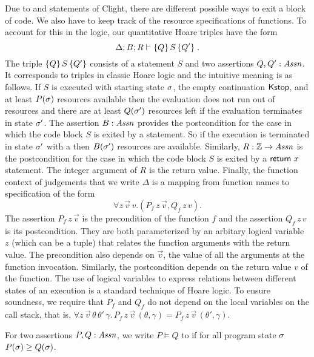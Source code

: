 \documentclass[nocopyrightspace,preprint]{sigplanconf}
\begin{document}
Due to  and  statements of Clight, there are
different possible ways to exit a block of code.  We also have to keep
track of the resource specifications of functions.  To account for
this in the logic, our quantitative Hoare triples have the form
$$
\Delta; B; R \vdash
\{ Q \}\,  S \, \{ Q' \} \; .
$$
The triple $\{ Q \}\,  S \, \{ Q' \}$ consists of a statement $S$ and
two assertions $Q,Q' : \mathit{Assn}$.  It corresponds to triples in classic
Hoare logic and the intuitive meaning is as follows.  If $S$ is
executed with starting state $\sigma$, the empty continuation
$\mathsf{Kstop}$, and at least $P(\sigma)$ resources available then the
evaluation does not run out of resources and there are at least
$Q(\sigma')$ resources left if the evaluation terminates in state
$\sigma'$.  The assertion $B : \mathit{Assn}$ provides the
postcondition for the case in which the code block $S$ is exited by a
 statement.  So if the execution is terminated in state
$\sigma'$ with a  then $B(\sigma')$ resources are
available.  Similarly, $R : \mathbb{Z} \to \mathit{Assn}$ is the postcondition for the
case in which the code block $S$ is exited by a $\mathsf{return}~x$
statement.  The integer argument of $R$ is the return value.
Finally, the function context of judgements that we write $\Delta$ is
a mapping from function names to specification of the form
$$
  \forall z \, \vec v \, v .(P_f \, z \, \vec v, Q_f \, z \, v).
$$
The assertion $P_f \, z \, \vec v$ is the precondition of the function
$f$ and the assertion $Q_f \, z \, v$ is its postcondition.  They are
both parameterized by an arbitary logical variable $z$ (which can be a
tuple) that relates the function arguments with the return value.  The
precondition also depends on $\vec v$, the value of all the arguments
at the function invocation.  Similarly, the postcondition depends on
the return value $v$ of the function.  The use of logical variables to
express relations between different states of an execution is a
standard technique of Hoare logic.
%
To ensure soundness, we require that $P_f$ and $Q_f$ do not depend on
the local variables on the call stack, that is, $\forall z \, \vec v
\, \theta \, \theta' \, \gamma . \, P_f \, z \, \vec v \,
(\theta,\gamma) = P_f \, z \, \vec v \, (\theta',\gamma)$.

For two assertions $P,Q : \mathit{Assn}$, we write $P \models Q$ to if for all
program state $\sigma$ $P(\sigma) \ge Q(\sigma)$.
\end{document}

